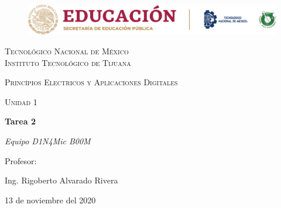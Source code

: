 \documentclass[letterpaper, 12pt]{article}
\begin{document}
    
    \begin{titlepage}
        \begin{figure}[ht]
            \centering
            \includegraphics[width=15cm]{logosITT.png}
        \end{figure}
        \centering
        {\scshape\LARGE Tecnológico Nacional de México\\Instituto Tecnológico de Tijuana\par}
        \vspace{1cm}
        {\scshape\Large Princípios Electricos y Aplicaciones Digitales\par}
        \vspace{1cm}
        {\scshape\Large Unidad 1\par}
        \vspace{1.5cm}
        {\huge\bfseries Tarea 2\par}
        \vspace{2cm}
        {\Large\itshape Equipo D1N4Mic B00M\par}
        \vfill
        Profesor: \par
        Ing. Rigoberto Alvarado Rivera
        
        \vfill

        {\large 13 de noviembre del 2020}
    \end{titlepage}

    \newpage
    \thispagestyle{empty}
    \tableofcontents
    \listoffigures
\end{document}
